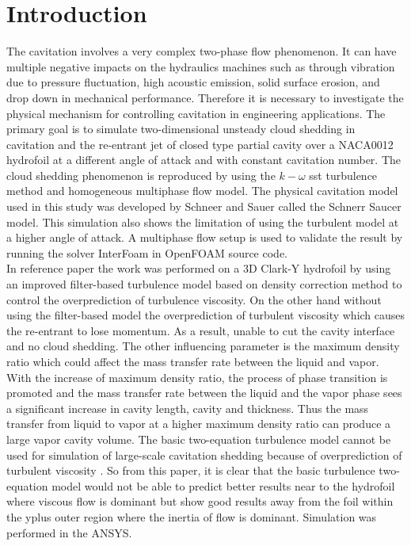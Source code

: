 \chapter*{Introduction}
\label{chap:introduction}
\renewcommand{\thepage}{\arabic{page}}
The cavitation involves a very complex two-phase flow phenomenon. It can have 
multiple  negative impacts on the hydraulics machines such as through vibration due to pressure fluctuation, high
acoustic emission, solid surface erosion, and drop down in mechanical
performance. Therefore it is necessary to investigate the physical
mechanism for controlling cavitation in engineering applications. The
primary goal is to simulate two-dimensional unsteady cloud shedding in
cavitation and the re-entrant jet of closed type partial cavity over a
NACA0012 hydrofoil at a different angle of attack and with constant
cavitation number. The cloud shedding phenomenon is reproduced by using 
the $k- {\omega}$ sst turbulence method and homogeneous multiphase flow model. The
physical cavitation model used in this study was developed by Schneer
and Sauer called the Schnerr Saucer model. This simulation also shows the
limitation of using the turbulent model at a higher angle of
attack. A multiphase flow setup is used to validate the result by
running the solver InterFoam in OpenFOAM source code.\\ In
reference paper \cite{ZHANG2017} the work was performed on a 3D Clark-Y
hydrofoil by using an improved filter-based turbulence model based on
density correction method to control the overprediction of turbulence viscosity. On the other hand without using
the filter-based model the overprediction of turbulent viscosity which
causes the re-entrant to lose momentum. As a result, unable to cut the
cavity interface and no cloud shedding. The other influencing parameter is the maximum density ratio which could affect the mass transfer rate between the liquid and vapor. With 
the increase of maximum density ratio, the process of phase transition is promoted and the mass transfer rate between the liquid and the vapor phase sees a significant increase in cavity length,
cavity and thickness. Thus the mass transfer from liquid to vapor at a higher maximum density ratio can produce a large vapor cavity volume. The basic two-equation turbulence
model cannot be used for simulation of large-scale cavitation shedding because of overprediction of turbulent viscosity
. So from this paper, it is clear
that the basic turbulence two-equation model would not be able to
predict better results near to the hydrofoil where viscous flow is
dominant but show good results away from the foil within the yplus
outer region where the inertia of flow is dominant. Simulation was performed in the ANSYS.


